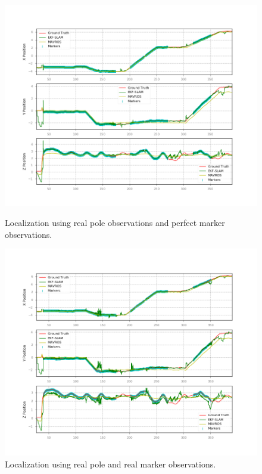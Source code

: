 \begin{figure}
    \centering
    \includegraphics[width=\textwidth]{Images/fig22-true-poles-fake-markers-wmap.png}
    \caption{Localization using real pole observations and perfect marker observations.}
    \label{fig:chapter3:simulation:b:real-poles-fake-markers-real-map}
    \centering
    \includegraphics[width=\textwidth]{Images/fig22-true-poles-markers-wmap.png}
    \caption{Localization using real pole and real marker observations.}
    \label{fig:chapter3:simulation:b:real-poles-markers-real-map}
\end{figure}

